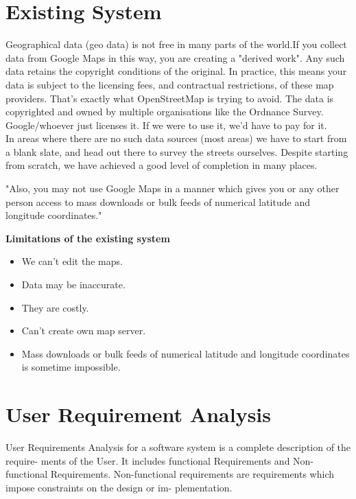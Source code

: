 \section{Existing System}
Geographical data (geo data) is not free in many parts of the world.If you collect data from Google Maps in this way, you are creating a "derived work". Any such data retains the copyright conditions of the original. In practice, this means your data is subject to the licensing fees, and contractual restrictions, of these map providers. That's exactly what OpenStreetMap is trying to avoid. The data is copyrighted and owned by multiple organisations like the Ordnance Survey. Google/whoever just licenses it. If we were to use it, we'd have to pay for it.\\ 

In areas where there are no such data sources (most areas) we have to start from a blank slate, and head out there to survey the streets ourselves. Despite starting from scratch, we have achieved a good level of completion in many places.  

"Also, you may not use Google Maps in a manner which gives you or any other person access to mass downloads or bulk feeds of numerical latitude and longitude coordinates."

{\bf {Limitations of the existing system }}
\begin{itemize}
\item We can't edit the maps.

\item Data may be inaccurate.

\item They are costly.

\item Can't create own map server.

\item Mass downloads or bulk feeds of numerical latitude and longitude coordinates is sometime impossible.
\end{itemize}

\section{User Requirement Analysis}
User Requirements Analysis for a software system is a complete description of the require-
ments of the User. It includes functional Requirements and Non-functional Requirements.
Non-functional requirements are requirements which impose constraints on the design or im-
plementation.

